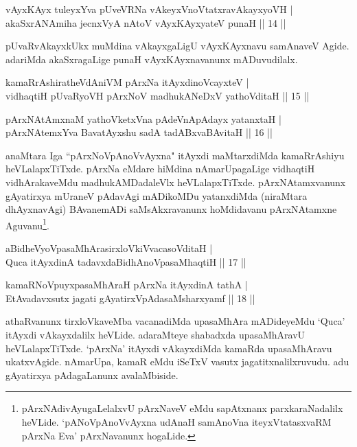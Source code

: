 \begin{shl}
vAyxKAyx tuleyxYva pUveVRNa vAkeyxVnoVtatxravAkayxyoVH | \\
akaSxrANAmiha jecnxVyA nAtoV vAyxKAyxyateV punaH \hfill ||  14 || 
\end{shl}

\begin{artha} 
pUvaRvAkayxkUkx muMdina vAkayxgaLigU vAyxKAyxnavu samAnaveV Agide. 
adariMda akaSxragaLige punaH vAyxKAyxnavanunx mADuvudilalx.
\end{artha}

\begin{shl}
kamaRrAshiratheVdAniVM pArxNa itAyxdinoVcayxteV | \\
vidhaqtiH pUvaRyoVH pArxNoV madhukANeDxV yathoVditaH \hfill ||  15 || 
\end{shl}

\begin{shl}
pArxNAtAmxnaM yathoVketxVna pAdeVnA\s \s pAdayx yatanxtaH | \\
pArxNAtemxYva BavatAyxshu sadA tadABxvaBAvitaH \hfill ||  16 || 
\end{shl}

\begin{artha} 
anaMtara Iga ``pArxNoVpAnoVvAyxna" itAyxdi maMtarxdiMda kamaRrAshiyu 
heVLalapxTiTxde. pArxNa eMdare hiMdina nAmarUpagaLige vidhaqtiH 
vidhArakaveMdu madhukAMDadaleVlx heVLalapxTiTxde. 
pArxNAtamxvanunx gAyatirxya mUraneV pAdavAgi mADikoMDu yatanxdiMda 
(niraMtara dhAyxnavAgi) BAvanemADi saMsAkxravanunx hoMdidavanu 
pArxNAtamxne Aguvanu\footnote[1]{pArxNAdivAyugaLelalxvU pArxNaveV eMdu 
sapAtxnanx parxkaraNadalilx heVLide. `pANoV\s pAnoVvAyxna udAnaH samAnoV\s na iteyxVtatasxvaRM pArxNa Eva' pArxNavanunx hogaLide.}.
\end{artha}


\begin{shl}
aBidheVyoVpasaMhArasirxloVkiVvacasoVditaH | \\
Quca itAyxdinA tadavxdaBidhAnoVpasaMhaqtiH \hfill ||  17 || 
\end{shl}

\begin{shl}
kamaRNoV\s puyxpasaMhAraH pArxNa itAyxdinA tathA | \\
EtAvadavxsutx jagati gAyatirxVpAdasaMsharxyamf \hfill ||  18 || 
\end{shl}

\begin{artha} 
athaRvanunx tirxloVkaveMba vacanadiMda upasaMhAra mADideyeMdu `Quca' 
itAyxdi vAkayxdalilx heVLide. adaraMteye shabadxda upasaMhAravU 
heVLalapxTiTxde. `pArxNa' itAyxdi vAkayxdiMda kamaRda upasaMhAravu 
ukatxvAgide. nAmarUpa, kamaR eMdu iSeTxV vasutx jagatitxnalilxruvudu. 
adu gAyatirxya pAdagaLanunx avalaMbiside.
\end{artha}


